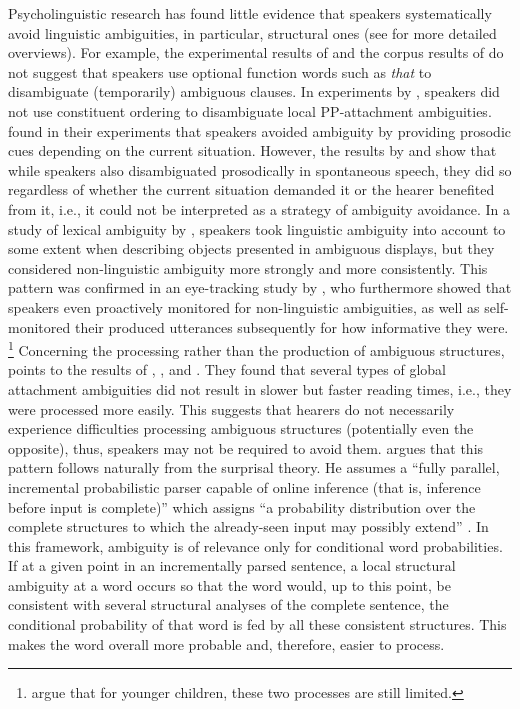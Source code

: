 Psycholinguistic research has found little evidence that speakers systematically avoid linguistic ambiguities, in particular, structural ones (see \cite{ferreira2008, wasow2015} for more detailed overviews).
For example, the experimental results of \citet{ferreira.dell2000} and the corpus  results of \citet{rohdenburg2021} do not suggest that speakers use optional function words such as \textit{that} to disambiguate (temporarily) ambiguous clauses.
In experiments by \citet{arnold.etal2004}, speakers did not use constituent ordering to disambiguate local PP-attachment ambiguities.
\citet{snedeker.trueswell2003} found in their experiments that speakers avoided ambiguity by providing prosodic  cues depending on the current situation.
However, the results by \citet{kraljic.brennan2005} and \citet{schafer.etal2005} show that while speakers also disambiguated prosodically  in spontaneous speech, they did so regardless of whether the current situation demanded it or the hearer benefited from it, i.e., it could not be interpreted as a strategy of ambiguity avoidance.
In a study of lexical ambiguity by \citet{ferreira.etal2005}, speakers took linguistic ambiguity into account to some extent when describing objects presented in ambiguous displays, but they considered non-linguistic ambiguity more strongly and more consistently. 
This pattern was confirmed in an eye-tracking study by \citet{rabagliati.robertson2017}, who furthermore showed that speakers even proactively monitored for non-linguistic ambiguities, as well as self-monitored their produced utterances subsequently for how informative they were.%
\footnote{\citet{rabagliati.robertson2017} argue that for younger children, these two processes are still limited.}
%
Concerning the processing rather than the production of ambiguous structures, \citet{levy2008} points to the results of \citet{traxler.etal1998}, \citet{vangompel.etal2001}, and \citet{vangompel.etal2005}.
They found that several types of global attachment ambiguities did not result in slower but faster reading times, i.e., they were processed more easily.
This suggests that hearers do not necessarily experience difficulties processing  ambiguous structures (potentially even the opposite), thus, speakers may not be required to avoid them.
\citet[1152--1153]{levy2008} argues that this pattern follows naturally from the surprisal theory.
He assumes a ``fully parallel, incremental probabilistic parser  capable of online inference (that is, inference before input is complete)'' which assigns ``a probability distribution over the complete structures to which the already-seen input may possibly extend'' \citep[1132]{levy2008}.
In this framework, ambiguity is of relevance only for conditional word probabilities.
If at a given point in an incrementally parsed sentence, a local structural ambiguity at a word occurs so that the word would, up to this point, be consistent with several structural analyses of the complete sentence, the conditional probability of that word is fed by all these consistent structures.
This makes the word overall more probable and, therefore, easier to process.


